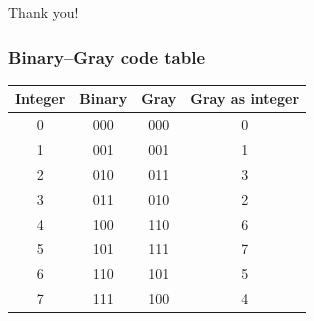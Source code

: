 \documentclass{beamer}
\theoremstyle{plain}
\theoremstyle{definition}
\begin{document}
\begin{frame}[standout]
      Thank you!
   \end{frame}

\begin{frame}
   \thispagestyle{empty}
\end{frame}

   \begin{frame}
      \frametitle{Binary--Gray code table}
      \begin{table}
         \centering
         \begin{tabular}{cccc}
            \toprule
            \textbf{Integer} & \textbf{Binary} & \textbf{Gray} &
            \textbf{Gray as integer} \\
            \midrule
            0 & 000 &  000 &  0 \\  
            1 & 001 &  001 &  1 \\
            2 & 010 &  011 &  3 \\
            3 & 011 &  010 &  2 \\
            4 & 100 &  110 &  6 \\
            5 & 101 &  111 &  7 \\
            6 & 110 &  101 &  5 \\
            7 & 111 &  100 &  4 \\
            \bottomrule
         \end{tabular}
      \end{table}
   \end{frame}
\end{document}
